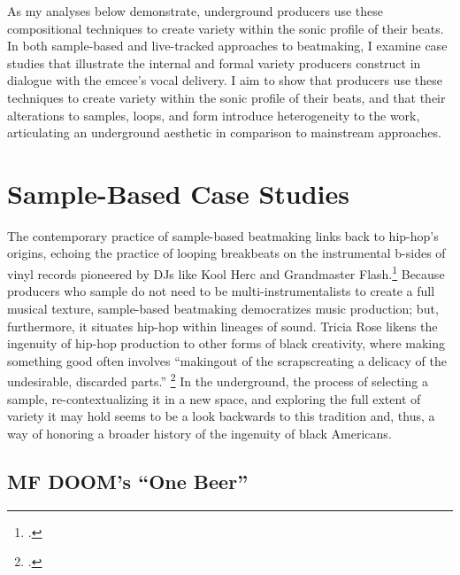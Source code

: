 As my analyses below demonstrate, underground producers use these compositional techniques to
create  variety within the sonic profile of their beats. In both sample-based and live-tracked
approaches to beatmaking, I examine case studies that illustrate the internal and formal variety
producers construct in dialogue with the emcee's vocal delivery. I aim to show that producers 
use these techniques to create variety within the sonic profile of their beats, and that their
alterations to samples, loops, and form introduce heterogeneity to the work, articulating an 
underground aesthetic in comparison to mainstream approaches.

\section{Sample-Based Case Studies} \label{samplebased}
The contemporary practice of sample-based beatmaking links back to hip-hop's origins, echoing
the practice of looping breakbeats on the instrumental b-sides of vinyl records pioneered by
DJs like Kool Herc and Grandmaster Flash.\footnote{
    \autocite[51]{triciaroseBlackNoiseRap1994}.} 
Because producers who sample do not need to be multi-instrumentalists to create a full musical
texture, sample-based  beatmaking democratizes music production; but, furthermore, it situates
hip-hop within lineages of sound. Tricia Rose likens the ingenuity of hip-hop production to other
forms of black creativity, where making something good often involves ``making\textellipsis out
of the scraps\textemdash creating a delicacy of the undesirable, discarded parts.''
    \footnote{\autocite[264]{triciaroseHipHopWarsWhat2008}.} 
In the underground, the process of selecting a sample, re-contextualizing it in a new space, and
exploring the full extent of variety it may hold seems to be a look backwards to this tradition 
and, thus, a way of honoring a broader history of the ingenuity of black Americans.

\subsection*{\centering MF DOOM's ``One Beer''}  

